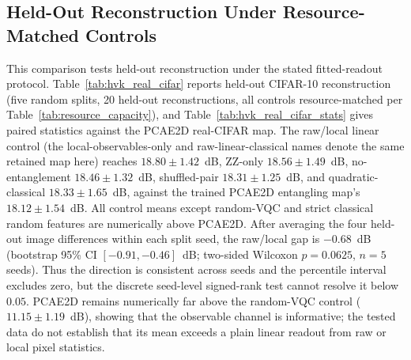 \documentclass[11pt]{article}
\begin{document}
\subsection{Held-Out Reconstruction Under Resource-Matched Controls}
\label{sec:holdout_headline}
This comparison tests held-out reconstruction under the stated fitted-readout protocol. Table~\ref{tab:hvk_real_cifar} reports held-out CIFAR-10 reconstruction (five random splits, 20 held-out reconstructions, all controls resource-matched per Table~\ref{tab:resource_capacity}), and Table~\ref{tab:hvk_real_cifar_stats} gives paired statistics against the PCAE2D real-CIFAR map. The raw/local linear control (the local-observables-only and raw-linear-classical names denote the same retained map here) reaches $18.80\pm1.42$~dB, ZZ-only $18.56\pm1.49$~dB, no-entanglement $18.46\pm1.32$~dB, shuffled-pair $18.31\pm1.25$~dB, and quadratic-classical $18.33\pm1.65$~dB, against the trained PCAE2D entangling map's $18.12\pm1.54$~dB. All control means except random-VQC and strict classical random features are numerically above PCAE2D. After averaging the four held-out image differences within each split seed, the raw/local gap is $-0.68$~dB (bootstrap 95\% CI $[-0.91,-0.46]$~dB; two-sided Wilcoxon $p=0.0625$, $n=5$ seeds). Thus the direction is consistent across seeds and the percentile interval excludes zero, but the discrete seed-level signed-rank test cannot resolve it below $0.05$. PCAE2D remains numerically far above the random-VQC control ($11.15\pm1.19$~dB), showing that the observable channel is informative; the tested data do not establish that its mean exceeds a plain linear readout from raw or local pixel statistics.
\end{document}
